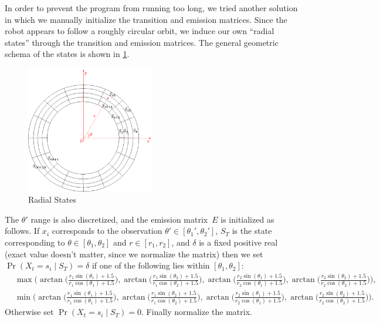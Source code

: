 \documentclass[twoside]{article}
\begin{document}
In order to prevent the program from running too long, we tried another solution in which we manually initialize the transition and emission matrices.
Since the robot appears to follow a roughly circular orbit, we induce our own ``radial states'' through the transition and emission matrices.
The general geometric schema of the states is shown in \cref{fig:radial-states}.
\begin{figure}[h]
  \centering
  \includegraphics[width=0.5\textwidth]{images/AK7}
  \caption{Radial States}\label{fig:radial-states}
\end{figure}
The $\theta'$ range is also discretized, and the emission matrix~$E$ is initialized as follows.
If $x_i$ corresponds to the observation $\theta' \in [\theta_1', \theta_2']$, $S_T$ is the state corresponding to ${\theta \in [\theta_1, \theta_2]}$ and ${r \in [r_1, r_2]}$, and $\delta$ is a fixed positive real (exact value doesn't matter, since we normalize the matrix) then we set ${\Pr(X_t = s_i \mid S_T) = \delta}$ if one of the following lies within ${[\theta_1, \theta_2]}$:
\begin{align*}
  &\max \bigg( \arctan \Big(\frac{r_1\sin(\theta_1) + 1.5}{r_1\cos(\theta_1) + 1.5} \Big), \arctan \Big( \frac{r_1 \sin(\theta_2) + 1.5}{r_1 \cos(\theta_2) + 1.5} \Big), \arctan \Big( \frac{r_2 \sin(\theta_1) + 1.5}{r_2 \cos(\theta_1) + 1.5} \Big), \arctan \Big( \frac{r_2 \sin(\theta_2) + 1.5}{r_2 \cos(\theta_2) + 1.5} \Big) \bigg),\\
  &\min \bigg( \arctan \Big(\frac{r_1\sin(\theta_1) + 1.5}{r_1\cos(\theta_1) + 1.5} \Big), \arctan \Big( \frac{r_1 \sin(\theta_2) + 1.5}{r_1 \cos(\theta_2) + 1.5} \Big), \arctan \Big( \frac{r_2 \sin(\theta_1) + 1.5}{r_2 \cos(\theta_1) + 1.5} \Big), \arctan \Big( \frac{r_2 \sin(\theta_2) + 1.5}{r_2 \cos(\theta_2) + 1.5} \Big) \bigg).
\end{align*}
Otherwise set ${\Pr(X_t = s_i \mid S_T) = 0}$.
Finally normalize the matrix.
\end{document}
